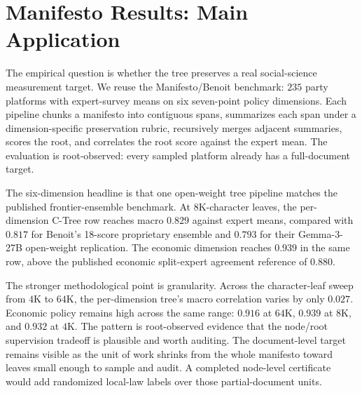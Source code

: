\section{Manifesto Results: Main Application}\label{sec:min-manifesto-results}

The empirical question is whether the tree preserves a real social-science
measurement target. We reuse the Manifesto/Benoit benchmark: $235$ party
platforms with expert-survey means on six seven-point policy dimensions. Each
pipeline chunks a manifesto into contiguous spans, summarizes each span under
a dimension-specific preservation rubric, recursively merges adjacent
summaries, scores the root, and correlates the root score against the expert
mean. The evaluation is root-observed: every sampled platform already has a
full-document target.

\begin{table}[t]
  \centering
  \resizebox{\linewidth}{!}{}
  \caption{\textbf{Pearson $r$ against Benoit expert-survey means.}
  The first block reproduces published Benoit reference rows; the remaining
  blocks report C-TreePO and controls using Gemma-4-31B-NVFP4. The main
  headline is the per-dimension tree at $8\mathrm{K}$-character leaves:
  macro $r=0.829$, above the proprietary ensemble's $0.817$ and the matched
  Gemma-3 open-weight replication's $0.793$.}
  \label{tab:min-benoit-headline}
\end{table}

The six-dimension headline is that one open-weight tree pipeline matches the
published frontier-ensemble benchmark. At $8\mathrm{K}$-character leaves, the
per-dimension C-Tree row reaches macro $0.829$ against expert means, compared
with $0.817$ for Benoit's 18-score proprietary ensemble and $0.793$ for their
Gemma-3-27B open-weight replication. The economic dimension reaches $0.939$ in
the same row, above the published economic split-expert agreement reference
of $0.880$.

The stronger methodological point is granularity. Across the character-leaf
sweep from $4\mathrm{K}$ to $64\mathrm{K}$, the per-dimension tree's macro
correlation varies by only $0.027$. Economic policy remains high across the
same range: $0.916$ at $64\mathrm{K}$, $0.939$ at $8\mathrm{K}$, and
$0.932$ at $4\mathrm{K}$. The pattern is root-observed evidence that the
node/root supervision tradeoff is plausible and worth auditing. The
document-level target remains visible as the unit of work shrinks from the
whole manifesto toward leaves small enough to sample and audit. A completed
node-level certificate would add randomized local-law labels over those
partial-document units.

